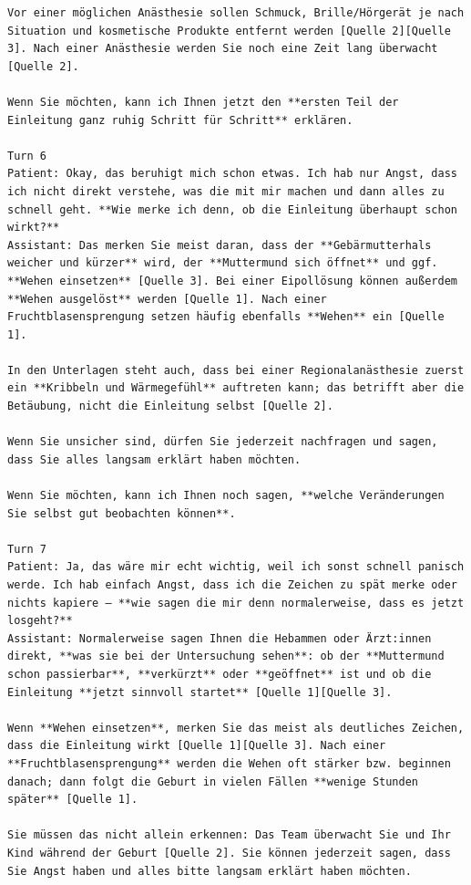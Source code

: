 \begin{Verbatim}[fontsize=\small,breaklines=true,breakanywhere=true]
Vor einer möglichen Anästhesie sollen Schmuck, Brille/Hörgerät je nach Situation und kosmetische Produkte entfernt werden [Quelle 2][Quelle 3]. Nach einer Anästhesie werden Sie noch eine Zeit lang überwacht [Quelle 2].

Wenn Sie möchten, kann ich Ihnen jetzt den **ersten Teil der Einleitung ganz ruhig Schritt für Schritt** erklären.

Turn 6
Patient: Okay, das beruhigt mich schon etwas. Ich hab nur Angst, dass ich nicht direkt verstehe, was die mit mir machen und dann alles zu schnell geht. **Wie merke ich denn, ob die Einleitung überhaupt schon wirkt?**
Assistant: Das merken Sie meist daran, dass der **Gebärmutterhals weicher und kürzer** wird, der **Muttermund sich öffnet** und ggf. **Wehen einsetzen** [Quelle 3]. Bei einer Eipollösung können außerdem **Wehen ausgelöst** werden [Quelle 1]. Nach einer Fruchtblasensprengung setzen häufig ebenfalls **Wehen** ein [Quelle 1].

In den Unterlagen steht auch, dass bei einer Regionalanästhesie zuerst ein **Kribbeln und Wärmegefühl** auftreten kann; das betrifft aber die Betäubung, nicht die Einleitung selbst [Quelle 2].

Wenn Sie unsicher sind, dürfen Sie jederzeit nachfragen und sagen, dass Sie alles langsam erklärt haben möchten.  

Wenn Sie möchten, kann ich Ihnen noch sagen, **welche Veränderungen Sie selbst gut beobachten können**.

Turn 7
Patient: Ja, das wäre mir echt wichtig, weil ich sonst schnell panisch werde. Ich hab einfach Angst, dass ich die Zeichen zu spät merke oder nichts kapiere — **wie sagen die mir denn normalerweise, dass es jetzt losgeht?**
Assistant: Normalerweise sagen Ihnen die Hebammen oder Ärzt:innen direkt, **was sie bei der Untersuchung sehen**: ob der **Muttermund schon passierbar**, **verkürzt** oder **geöffnet** ist und ob die Einleitung **jetzt sinnvoll startet** [Quelle 1][Quelle 3].

Wenn **Wehen einsetzen**, merken Sie das meist als deutliches Zeichen, dass die Einleitung wirkt [Quelle 1][Quelle 3]. Nach einer **Fruchtblasensprengung** werden die Wehen oft stärker bzw. beginnen danach; dann folgt die Geburt in vielen Fällen **wenige Stunden später** [Quelle 1].

Sie müssen das nicht allein erkennen: Das Team überwacht Sie und Ihr Kind während der Geburt [Quelle 2]. Sie können jederzeit sagen, dass Sie Angst haben und alles bitte langsam erklärt haben möchten.


\end{Verbatim}
